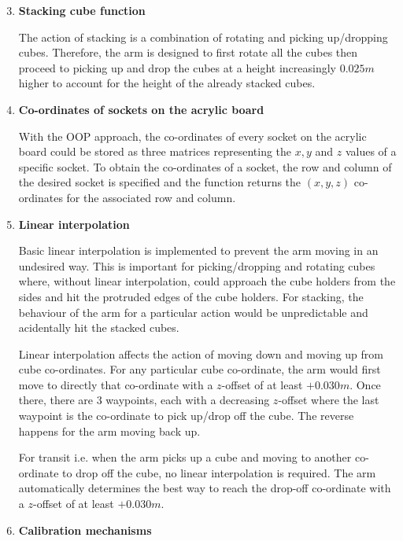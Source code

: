 \documentclass[9pt, a4paper]{article}
\begin{document}
\begin{enumerate}
  \setcounter{enumi}{2}
  \item \textbf{Stacking cube function}
  
  The action of stacking is a combination of rotating and picking
  up/dropping cubes. Therefore, the arm is designed to first rotate all the cubes
  then proceed to picking up and drop the cubes at a height increasingly $0.025m$ higher to
  account for the height of the already stacked cubes. 
  
  \item \textbf{Co-ordinates of sockets on the acrylic board}
  
  With the OOP approach, the co-ordinates of every socket on the
  acrylic board could be stored as three matrices representing the $x, y$ and $z$
  values of a specific socket. To obtain the co-ordinates of a socket, the row and
  column of the desired socket is specified and the function returns the $(x,y,z)$
  co-ordinates for the associated row and column.  

  \item \textbf{Linear interpolation}
  
  Basic linear interpolation is implemented to prevent the arm moving in an
  undesired way. This is important for picking/dropping and rotating cubes where,
  without linear interpolation, could approach the cube holders from the sides
  and hit the protruded edges of the cube holders. For stacking, the behaviour
  of the arm for a particular action would be unpredictable and acidentally hit
  the stacked cubes. 

  Linear interpolation affects the action of moving down and moving up
  from cube co-ordinates. For any particular cube co-ordinate, the arm would first move to directly
  that co-ordinate with a $z$-offset of at least $+0.030m$. Once there, there
  are 3 waypoints, each with a decreasing $z$-offset where the last waypoint is
  the co-ordinate to pick up/drop off the cube. The reverse happens for the
  arm moving back up.

  For transit i.e. when the arm picks up a cube and moving to another
  co-ordinate to drop off the cube, no linear interpolation is required. The arm
  automatically determines the best way to reach the drop-off co-ordinate with a
  $z$-offset of at least $+0.030m$. 

  \item \textbf{Calibration mechanisms}
  
  
\end{enumerate}
\end{document}
